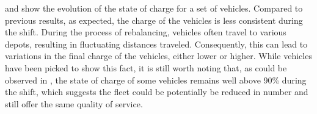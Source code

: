  and  show the evolution of the state of charge for a set of vehicles. Compared to previous results, as expected, the charge of the vehicles is less consistent during the shift. During the process of rebalancing, vehicles often travel to various depots, resulting in fluctuating distances traveled. Consequently, this can lead to variations in the final charge of the vehicles, either lower or higher. While vehicles have been picked to show this fact, it is still worth noting that, as could be observed in , the state of charge of some vehicles remains well above 90\% during the shift, which suggests the fleet could be potentially be reduced in number and still offer the same quality of service. \\


